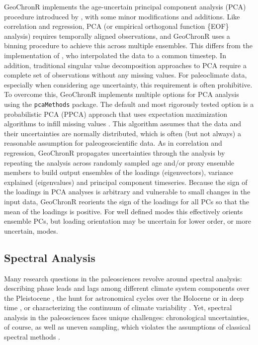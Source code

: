 \documentclass[gc, manuscript]{copernicus}
\begin{document}
GeoChronR implements the age-uncertain principal component analysis
(PCA) procedure introduced by \citet{anchukaitis2013mceof}, with some
minor modifications and additions. Like correlation and regression, PCA
(or empirical orthogonal function \{EOF\} analysis) requires temporally
aligned observations, and GeoChronR uses a binning procedure to achieve
this across multiple ensembles. This differs from the implementation of
\citet{anchukaitis2013mceof}, who interpolated the data to a common
timestep. In addition, traditional singular value decomposition
approaches to PCA require a complete set of observations without any
missing values. For paleoclimate data, especially when considering age
uncertainty, this requirement is often prohibitive. To overcome this,
GeoChronR implements multiple options for PCA analysis using the
\texttt{pcaMethods} package. The default and most rigorously tested
option is a probabilistic PCA (PPCA) approach that uses expectation
maximization algorithms to infill missing values
\citep{roweis1998algorithms}. This algorithm assumes that the data and
their uncertainties are normally distributed, which is often (but not
always) a reasonable assumption for paleogeoscientific data. As in
correlation and regression, GeoChronR propagates uncertainties through
the analysis by repeating the analysis across randomly sampled age
and/or proxy ensemble members to build output ensembles of the loadings
(eigenvectors), variance explained (eigenvalues) and principal component
timeseries. Because the sign of the loadings in PCA analyses is
arbitrary and vulnerable to small changes in the input data, GeoChronR
reorients the sign of the loadings for all PCs so that the mean of the
loadings is positive. For well defined modes this effectively orients
ensemble PCs, but loading orientation may be uncertain for lower order,
or more uncertain, modes.

\subsection{Spectral Analysis}\label{sec:spec_theory}

Many research questions in the paleosciences revolve around spectral
analysis: describing phase leads and lags among different climate system
components over the Pleistocene \citep[SPECMAP,][]{imbrie1984orbital},
the hunt for astronomical cycles over the Holocene
\citep[\citet{bond2001}]{mill_monograph} or in deep time
\citep[\citet{Meyers_2012},\citet{Meyers_2015}]{MeyersSageman_2007}, or
characterizing the continuum of climate variability
\citep[\citet{ZhuPNAS2019}]{Huybers_Curry2006}. Yet, spectral analysis
in the paleosciences faces unique challenges: chronological
uncertainties, of course, as well as uneven sampling, which violates the
assumptions of classical spectral methods \citep{Ghil02}.
\end{document}
